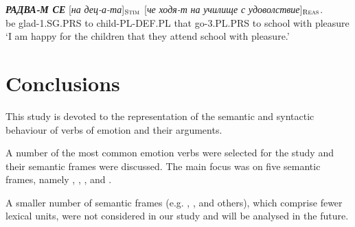 \documentclass[output=paper,colorlinks,citecolor=brown]{langscibook}
\begin{document}
\begin{exe}  
\ex  \label{ch6:ex:46}
\gll \textit{\textbf{РАДВА-М СЕ}} [\textit{на} \textit{дец-а-та}]$_{\text{\textsc{Stim}}}$ [\textit{че} \textit{ходя-т} \textit{на} \textit{училище} \textit{с} \textit{удоволствие}]$_{\text{\textsc{Reas}}}$.\\ 
{be glad-1.SG.PRS}  {to} {child-PL-DEF.PL} {that} {go-3.PL.PRS} {to} {school} {with} {pleasure}
\\ %
\glt `I am happy for the children that they attend school with pleasure.'
\end{exe}


 


\section{Conclusions} \label{ch6:sec:6}

This study is devoted to the representation of the semantic and syntactic behaviour of verbs of emotion and their arguments. %

A number of the most common emotion verbs were selected for the study and their semantic frames were discussed. The main focus was on five semantic frames, namely , , 
,
 and .

A smaller number of semantic frames (e.g. , ,  and others), which comprise fewer lexical units, were not considered in our study and will be analysed in the future.
\end{document}
